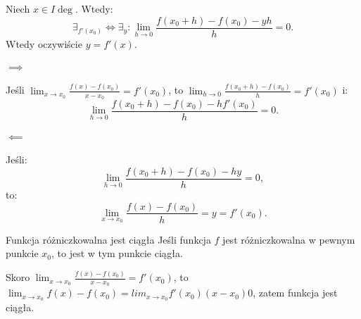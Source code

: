 \documentclass{article}
\numberwithin{defi}{section}
\numberwithin{defi}{section}
\begin{document}
    \begin{twier}[label=twier:poch-do-0]{}
        Niech $x \in I \deg$. Wtedy:\begin{equation}
            \exists_{f'(x_0)} \iff \exists_{y}: \lim_{h \to 0} \frac{f(x_0+h) - f(x_0) - y h}{h} = 0.
        \end{equation} Wtedy oczywiście $y = f'(x)$.
    \end{twier}

    \begin{dow}
        \paragraph{$\implies$} Jeśli $\lim_{x \to x_0} \frac{f(x) - f(x_0)}{x - x_0} = f'(x_0)$, to $\lim_{h \to 0} \frac{f(x_0 + h) - f(x_0)}{h} = f'(x_0)$ i: \begin{equation*}
            \lim_{h \to 0} \frac{f(x_0 + h) - f(x_0) - h f'(x_0)}{h} = 0.            
        \end{equation*}

        \paragraph{$\impliedby$} Jeśli: \begin{equation*}
            \lim_{h \to 0} \frac{f(x_0 + h) - f(x_0) - h  y}{h} = 0,
        \end{equation*} to: \begin{equation*}
            \lim_{x \to x_0} \frac{f(x) - f(x_0)}{h} = y = f'(x_0).
        \end{equation*}
    \end{dow}

    \begin{twier}{Funkcja różniczkowalna jest ciągła}
        Jeśli funkcja $f$ jest różniczkowalna w pewnym punkcie $x_0$, to jest w tym punkcie ciągła.
    \end{twier}

    \begin{dow}
        Skoro $\lim_{x \to x_0} \frac{f(x) - f(x_0)}{x - x_0} = f'(x_0)$, to $\lim_{x \to x_0} f(x) - f(x_0)= lim_{x \to x_0} f'(x_0) (x - x_0) 0$, zatem funkcja jest ciągła.

    \end{dow}
\end{document}
